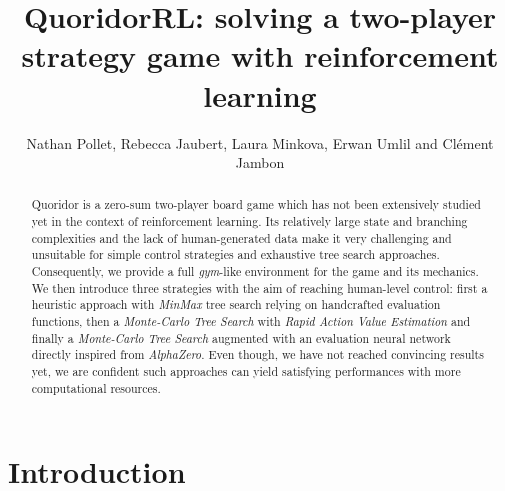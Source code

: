 \documentclass[journal, a4paper]{IEEEtran}
\newif\ifanonymous
\begin{document}
\title{QuoridorRL: solving a two-player strategy game with reinforcement learning}
\ifanonymous
\author{Anonymous Authors}
\else
\author{Nathan Pollet, Rebecca Jaubert, Laura Minkova, Erwan Umlil and Clément Jambon}
\fi
\maketitle

\begin{abstract}
Quoridor is a zero-sum two-player board game which has not been extensively studied yet in the context of reinforcement learning. Its relatively large state and branching complexities and the lack of human-generated data make it very challenging and unsuitable for simple control strategies and exhaustive tree search approaches. Consequently, we provide a full \textit{gym}-like environment for the game and its mechanics. We then introduce three strategies with the aim of reaching human-level control: first a heuristic approach with \textit{MinMax} tree search relying on handcrafted evaluation functions, then a \textit{Monte-Carlo Tree Search} with \textit{Rapid Action Value Estimation} and finally a \textit{Monte-Carlo Tree Search} augmented with an evaluation neural network directly inspired from \textit{AlphaZero}. Even though, we have not reached convincing results yet, we are confident such approaches can yield satisfying performances with more computational resources.
\end{abstract}

\section{Introduction}
\label{sec:intro}
\end{document}
